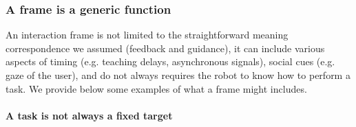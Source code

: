 




\subsubsection*{A frame is a generic function}
\label{chapter:limitations:framegeneric}

An interaction frame is not limited to the straightforward meaning correspondence we assumed (feedback and guidance), it can include various aspects of timing (e.g. teaching delays, asynchronous signals), social cues (e.g. gaze of the user), and do not always requires the robot to know how to perform a task. We provide below some examples of what a frame might includes.

\paragraph{A task is not always a fixed target}

